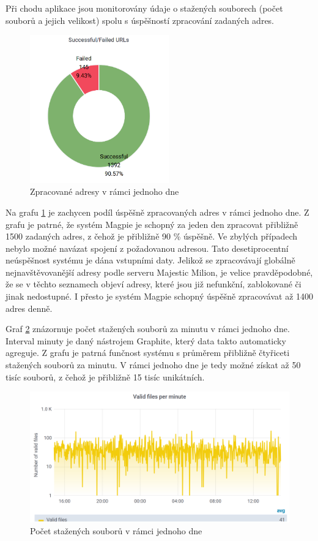 \documentclass[thesis=M,czech,hidelinks]{FITthesis}[2013/05/06]
\begin{document}
Při chodu aplikace jsou monitorovány údaje o stažených souborech (počet souborů a jejich velikost) spolu s úspěšností zpracování zadaných adres. 

\begin{figure}[h]
	\centering
	\includegraphics[width=6cm]{pictures/URLgraph.png}
	\caption{Zpracované adresy v rámci jednoho dne}
	\label{fig:urls}
\end{figure}

Na grafu \ref{fig:urls} je zachycen podíl úspěšně zpracovaných adres v rámci jednoho dne. Z grafu je patrné, že systém Magpie je schopný za jeden den zpracovat přibližně 1500 zadaných adres, z čehož je přibližně 90 \% úspěšně. Ve zbylých případech nebylo možné navázat spojení z požadovanou adresou. Tato  desetiprocentní neúspěšnost systému je dána vstupními daty. Jelikož se zpracovávají globálně nejnavštěvovanější adresy podle serveru Majestic Milion, je velice pravděpodobné, že se v těchto seznamech objeví adresy, které jsou již nefunkční, zablokované či jinak nedostupné. I přesto je systém Magpie schopný úspěšně zpracovávat až 1400 adres denně.

Graf \ref{fig:files2} znázornuje počet stažených souborů za minutu v rámci jednoho dne. Interval minuty je daný nástrojem Graphite, který data takto automaticky agreguje. Z grafu je patrná funčnost systému s průměrem přibližně čtyřiceti stažených souborů za minutu. V rámci jednoho dne je tedy možné získat až 50 tisíc souborů, z čehož je přibližně 15 tisíc unikátních.


\begin{figure}[h]
	\centering
	\includegraphics[width=13cm]{pictures/files3.png}
	\caption{Počet stažených souborů v rámci jednoho dne}
	\label{fig:files2}
\end{figure}
\end{document}
